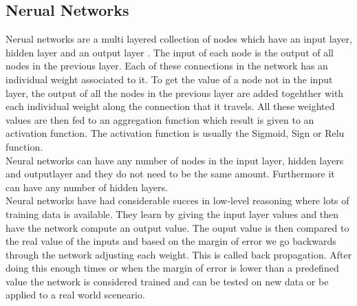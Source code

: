 \subsection{Nerual Networks}
Nerual networks are a multi layered collection of nodes which have an input layer, hidden layer and an output layer \cite{AI-book}.
The input of each node is the output of all nodes in the previous layer.
Each of these connections in the network has an individual weight associated to it.
To get the value of a node not in the input layer, the output of all the nodes in the previous layer are added togehther with each individual weight along the connection that it travels.
All these weighted values are then fed to an aggregation function which result is given to an activation function.
The activation function is usually the Sigmoid, Sign or Relu function.
\\
Neural networks can have any number of nodes in the input layer, hidden layers and outputlayer and they do not need to be the same amount.
Furthermore it can have any number of hidden layers.
\\
Neural networks have had considerable succes in low-level reasoning where lots of training data is available.
They learn by giving the input layer values and then have the network compute an output value.
The ouput value is then compared to the real value of the inputs and based on the margin of error we go backwards through the network adjusting each weight.
This is called back propagation.
After doing this enough times or when the margin of error is lower than a predefined value the network is considered trained and can be tested on new data or be applied to a real world sceneario.

